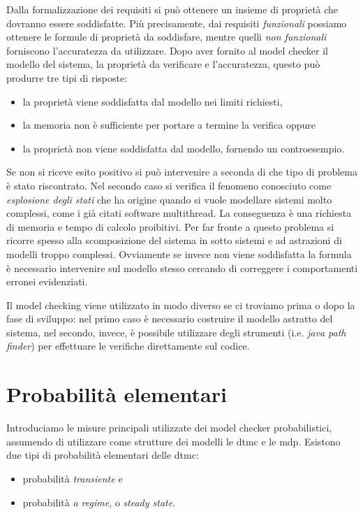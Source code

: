Dalla formalizzazione dei requisiti si può ottenere un insieme di proprietà che dovranno essere soddisfatte. Più precisamente, dai requisiti \emph{funzionali} possiamo ottenere le formule di proprietà da soddisfare, mentre quelli \emph{non funzionali} forniscono l'accuratezza da utilizzare. Dopo aver fornito al model checker il modello del sistema, la proprietà da verificare e l'accuratezza, questo può produrre tre tipi di risposte:
\begin{itemize}
	\item la proprietà viene soddisfatta dal modello nei limiti richiesti,
	\item la memoria non è sufficiente per portare a termine la verifica oppure
	\item la proprietà non viene soddisfatta dal modello, fornendo un controesempio.
\end{itemize}
Se non si riceve esito positivo si può intervenire a seconda di che tipo di problema è stato riscontrato. Nel secondo caso si verifica il fenomeno conosciuto come \emph{esplosione degli stati} che ha origine quando si vuole modellare sistemi molto complessi, come i già citati software multithread. La conseguenza è una richiesta di memoria e tempo di calcolo proibitivi. Per far fronte a questo problema si ricorre spesso alla scomposizione del sistema in sotto sistemi e ad astrazioni di modelli troppo complessi. Ovviamente se invece non viene soddisfatta la formula è necessario intervenire sul modello stesso cercando di correggere i comportamenti erronei evidenziati.

Il model checking viene utilizzato in modo diverso se ci troviamo prima o dopo la fase di sviluppo: nel primo caso è necessario costruire il modello astratto del sistema, nel secondo, invece, è possibile utilizzare degli strumenti (i.e. \emph{java path finder}) per effettuare le verifiche direttamente sul codice. 



\section{Probabilit\`a elementari}
Introduciamo le misure principali utilizzate dei model checker probabilistici, assumendo di utilizzare come strutture dei modelli le \ac{dtmc} e le \ac{mdp}. Esistono due tipi di probabilità elementari delle \ac{dtmc}:
\begin{itemize}
	\item probabilità \emph{transiente} e
	\item probabilità \emph{a regime}, o \emph{steady state}.
\end{itemize}

